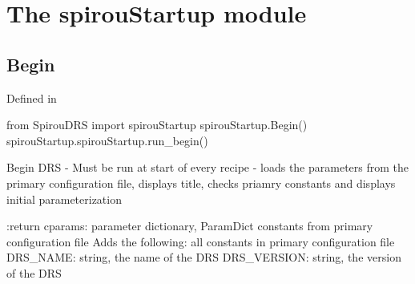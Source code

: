 
\clearpage
\newpage
\noindent\begin{minipage}{\textwidth}
\section{The spirouStartup module}
\label{ch:the_module:spirouStartup}

\subsection{Begin}

Defined in \spirouStartup{}

\begin{pythonbox}
from SpirouDRS import spirouStartup
spirouStartup.Begin()
spirouStartup.spirouStartup.run_begin()
\end{pythonbox}

\begin{pythondocstring}
Begin DRS - Must be run at start of every recipe
- loads the parameters from the primary configuration file, displays
  title, checks priamry constants and displays initial parameterization

:return cparams: parameter dictionary, ParamDict constants from primary
                 configuration file
        Adds the following:
            all constants in primary configuration file
            DRS_NAME: string, the name of the DRS
            DRS_VERSION: string, the version of the DRS
\end{pythondocstring}
\end{minipage}

